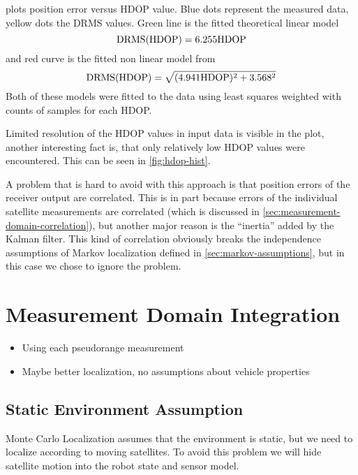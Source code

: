  plots position error versus HDOP value.
Blue dots represent the measured data, yellow dots the DRMS values.
Green line is the fitted theoretical linear model
\begin{equation}
\mathrm{DRMS}(\mathrm{HDOP}) = \num{6.255} \mathrm{HDOP}
\end{equation}
and red curve is the fitted non linear model from \cite{www-wilson}
\begin{equation}
\mathrm{DRMS}(\mathrm{HDOP}) = \sqrt{(\num{4.941}\mathrm{HDOP})^2 + \num{3.568}^2}
\end{equation}
Both of these models were fitted to the data using least squares weighted with counts of samples
for each HDOP.

Limited resolution of the HDOP values in input data is visible in the plot,
another interesting fact is, that only relatively low HDOP values were encountered.
This can be seen in \cref{fig:hdop-hist}.

A problem that is hard to avoid with this approach is that position errors of the
receiver output are correlated.
This is in part because errors of the individual satellite measurements are correlated
(which is discussed in \ref{sec:measurement-domain-correlation}), but another major reason
is the \enquote{inertia} added by the Kalman filter.
This kind of correlation obviously breaks the independence assumptions of Markov
localization defined in \ref{sec:markov-assumptions}, but in this case we chose to ignore
the problem. 

\section{Measurement Domain Integration}
\label{sec:measurement-domain}

\begin{itemize}
\item Using each pseudorange measurement
\item Maybe better localization, no assumptions about vehicle properties
\end{itemize}

\subsection{Static Environment Assumption}
\label{sec:gps-mcl-static-env}
Monte Carlo Localization assumes that the environment is static, but we need to
localize according to moving satellites.
To avoid this problem we will hide satellite motion into the robot state and sensor model.

